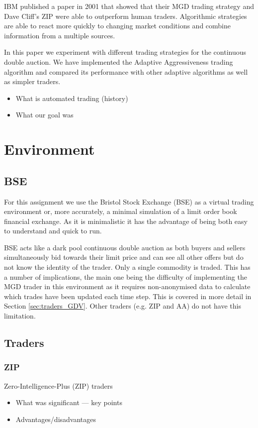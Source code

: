 \documentclass{acm_proc_article-sp}
\begin{document}
IBM published a paper in 2001 that showed that their MGD trading strategy and
Dave Cliff's ZIP were able to outperform human traders.
Algorithmic strategies are able to react more quickly to changing market
conditions and combine information from a multiple sources.

In this paper we experiment with different trading strategies for the
continuous double auction.
We have implemented the Adaptive Aggressiveness trading algorithm and compared
its performance with other adaptive algorithms as well as simpler traders.

\begin{itemize}
	\item What is automated trading (history)
	\item What our goal was
\end{itemize}


\section{Environment} \label{sec:environment}
\subsection{BSE} \label{sec:BSE}
For this assignment we use the Bristol Stock Exchange (BSE) as a virtual trading environment or, 
more accurately, a minimal simulation of a limit order book financial exchange. As it is 
minimalistic it has the advantage of being both easy to understand and quick to run.

BSE acts like a dark pool continuous double auction as both buyers and sellers simultaneously bid 
towards their limit price and can see all other offers but do not know the identity of the trader.
Only a single commodity is traded. 
This has a number of implications, the main one being the difficulty of implementing the MGD trader 
in this environment as it requires non-anonymised data to calculate which trades have been updated 
each time step. This is covered in more detail in Section \ref{sec:traders_GDV}. Other traders (e.g. 
ZIP and AA) do not have this limitation.\\


\subsection{Traders} \label{sec:traders}
\subsubsection{ZIP} \label{sec:traders_ZIP}
Zero-Intelligence-Plus (ZIP) traders
\begin{itemize} \itemsep0pt
	\item What was significant --- key points
	\item Advantages/disadvantages
\end{itemize}
\end{document}
